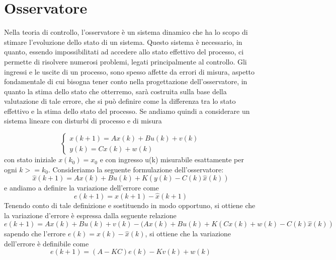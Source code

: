 \section{Osservatore}
Nella teoria di controllo, l'osservatore è un sistema dinamico che ha lo scopo di stimare l'evoluzione dello stato di un sistema. Questo sistema è necessario, in quanto, essendo impossibilitati ad accedere allo stato effettivo del processo, ci permette di risolvere numerosi problemi, legati principalmente al controllo. Gli ingressi e le uscite di un processo, sono spesso affette da errori di misura, aspetto fondamentale di cui bisogna  tener conto  nella progettazione dell'osservatore, in quanto la stima dello stato che otterremo, sarà costruita sulla base della valutazione di tale errore, che si può definire come la differenza tra lo stato effettivo e la stima dello stato del processo.
Se andiamo quindi a considerare un sistema lineare con disturbi di processo e di misura

\[
\begin{cases} 
x(k+1)=Ax(k)+Bu(k)+v(k)\\
y(k)=Cx(k)+ w(k)
\end{cases}
\]
con stato iniziale $x(k_0)=x_0$ e con ingresso u(k) misurabile  esattamente per ogni $k>=k_0$.
Consideriamo la seguente formulazione dell'osservatore:
\[\hat{x}(k+1)=Ax(k)+Bu(k)+K(y(k)-C(k)\hat{x}(k))\]
e andiamo a definire la variazione dell'errore come  
\[{e}(k+1)={x}(k+1)-{\hat{x}}(k+1)\]
Tenendo conto di tale definizione e sostituendo in modo opportuno, si ottiene che la variazione d'errore è espressa dalla seguente relazione
\[{e}(k+1)=Ax(k)+Bu(k)+v(k)-(Ax(k)+Bu(k)+K(Cx(k)+w(k)-C(k)\hat{x}(k))\]
sapendo che l'errore $e(k)=x(k)-\hat{x}(k)$, si ottiene che la variazione dell'errore è definibile come 
\[{e}(k+1)=(A-KC)e(k)-Kv(k)+w(k)\]